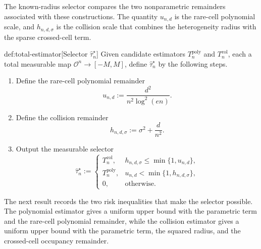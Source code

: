 The known-radius selector compares the two nonparametric remainders associated with these constructions. The quantity \(u_{n,d}\) is the rare-cell polynomial scale, and \(h_{n,d,\sigma}\) is the collision scale that combines the heterogeneity radius with the sparse crossed-cell term.

\begin{algorithmv}{def:total-estimator}[Selector \(\widehat\tau_n^{\star}\)]
Given candidate estimators \(T_n^{\mathrm{poly}}\) and \(T_n^{\mathrm{col}}\), each a total measurable map \(\mathcal O^n\to[-M,M]\), define \(\widehat\tau_n^{\star}\) by the following steps.
\begin{enumerate}
\item Define the rare-cell polynomial remainder
\[
u_{n,d}:=\frac{d^2}{n^2\log^2(en)}.
\]
\item Define the collision remainder
\[
h_{n,d,\sigma}:=\sigma^2+\frac{d}{n^2}.
\]
\item Output the measurable selector
\[
\widehat\tau_n^{\star}:=
\begin{cases}
T_n^{\mathrm{col}},&h_{n,d,\sigma}\le\min\{1,u_{n,d}\},\\
T_n^{\mathrm{poly}},&u_{n,d}<\min\{1,h_{n,d,\sigma}\},\\
0,&\text{otherwise}.
\end{cases}
\]
\end{enumerate}
\end{algorithmv}

The next result records the two risk inequalities that make the selector possible. The polynomial estimator gives a uniform upper bound with the parametric term and the rare-cell polynomial remainder, while the collision estimator gives a uniform upper bound with the parametric term, the squared radius, and the crossed-cell occupancy remainder.

